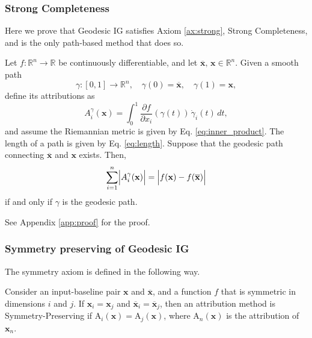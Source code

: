 \subsubsection{Strong Completeness}
\label{sec:strong_comp}

Here we prove that Geodesic IG satisfies Axiom \ref{ax:strong}, Strong Completeness, and is the only path-based method that does so. 

\begin{theorem}
	\label{theo:strong}
	Let \(f:\mathbb{R}^n\to\mathbb{R}\) be continuously differentiable, and let \(\overline{\mathbf{x}},\, \mathbf{x}\in\mathbb{R}^n\). Given a smooth path 
	\[
	\gamma:[0,1]\to\mathbb{R}^n,\quad \gamma(0)=\overline{\mathbf{x}},\quad \gamma(1)=\mathbf{x},
	\]
	define its attributions as
	\begin{equation}
		A_i^{\gamma}(\mathbf{x}) = \int_0^1 \frac{\partial f}{\partial x_i}(\gamma(t))\,\dot{\gamma}_i(t)\,dt,
		\label{eq:attribution}
	\end{equation}
	and assume the Riemannian metric is given by Eq. \ref{eq:inner_product}. 
	The length of a path is given by Eq. \ref{eq:length}. 
	Suppose that the geodesic path connecting \(\overline{\mathbf{x}}\) and \(\mathbf{x}\) exists. Then,
	\begin{equation*}
		\sum_{i=1}^n \Bigl| A_i^{\gamma}(\mathbf{x}) \Bigr| = \Bigl| f(\mathbf{x})-f(\overline{\mathbf{x}}) \Bigr|
	\end{equation*}
	if and only if \(\gamma\) is the geodesic path.
\end{theorem}


See Appendix \ref{app:proof} for the proof.


\subsubsection{Symmetry preserving of Geodesic IG}

The symmetry axiom is defined in the following way. 
\begin{axiom}
	Consider an input-baseline pair $\textbf{x}$ and $\overline{\textbf{x}}$, and a function $f$ that is symmetric in dimensions $i$ and $j$. If $\textbf{x}_i = \textbf{x}_j$ and $\overline{\textbf{x}}_i = \overline{\textbf{x}}_j$, then an attribution method is Symmetry-Preserving if $\text{A}_i(\textbf{x}) = \text{A}_j(\textbf{x})$, where $\text{A}_n(\textbf{x})$ is the attribution of $\textbf{x}_n$.
\end{axiom}

